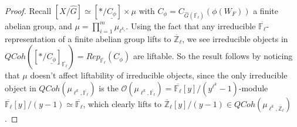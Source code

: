 \documentclass{article}
\begin{document}
	\begin{proof}
		
		Recall $[X/\hat{G}] \simeq [*/\underline{C_\phi}] \times \mu$ with $C_\phi=C_{\hat{G}(\overline{\mathbb{F}_{\ell}})}(\phi(W_F))$ a finite abelian group, and $\mu=\prod_{i=1}^m\mu_{\ell^{k_i}}$. Using the fact that any irreducible $\overline{\mathbb{F}_{\ell}}$-representation of a finite abelian group lifts to $\overline{\mathbb{Z}}_{\ell}$, we see irreducible objects in $QCoh([*/\underline{C_\phi}]_{\overline{\mathbb{F}_{\ell}}})=Rep_{\overline{\mathbb{F}_{\ell}}}(C_\phi)$ are liftable. So the result follows by noticing that $\mu$ doesn't affect liftability of irreducible objects, since the only irreducible object in $QCoh(\mu_{\ell^{k}, \overline{\mathbb{F}_{\ell}}})$ is the $\mathcal{O}(\mu_{\ell^{k}, \overline{\mathbb{F}_{\ell}}})=\overline{\mathbb{F}_{\ell}}[y]/(y^{\ell^k}-1)$-module $\overline{\mathbb{F}_{\ell}}[y]/(y-1) \simeq \overline{\mathbb{F}_{\ell}}$, which clearly lifts to $\overline{\mathbb{Z}}_{\ell}[y]/(y-1) \in QCoh(\mu_{\ell^{k}, \overline{\mathbb{Z}}_{\ell}})$.
		
		
		
		
	\end{proof}
	
\end{document}
